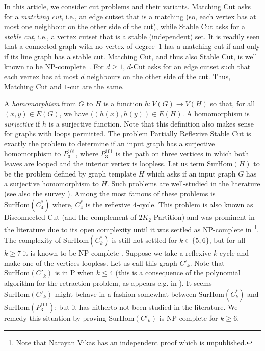 \documentclass[a4paper,UKenglish,cleveref, autoref,thm-restate]{lipics-v2021}
\newcommand{\SurHom}{\ensuremath{\mathrm{SurHom}}}
\begin{document}
In this article, we consider cut problems and their variants. 
{\sc Matching Cut} asks 
for a {\it matching cut}, i.e., an edge cutset that is a matching (so, each vertex has at most one neighbour on the other side of the cut),  while {\sc Stable Cut} asks for a
{\it stable cut}, i.e., a vertex cutset that is a stable (independent) set. 
It is readily seen that a connected graph with no vertex of degree~$1$ has a matching cut if and only if its line graph has a stable cut. 
{\sc Matching Cut}, and thus also {\sc Stable Cut}, is well known to be
NP-complete~\cite{Chvatal1984}.
For $d\geq 1$, {\sc $d$-Cut} asks for an edge cutset
such that
each vertex has at most $d$ neighbours on the other side of the cut.  Thus, {\sc Matching Cut} and {\sc $1$-cut} are the same.

A \emph{homomorphism} from $G$ to $H$ is a function $h:V(G)\rightarrow V(H)$ so that, for all $(x,y) \in E(G)$, we have $((h(x),h(y)) \in E(H)$. A homomorphism is \emph{surjective} if $h$ is a surjective function. Note that this definition also makes sense for graphs with loops permitted. The problem  {\sc Partially Reflexive Stable Cut} is exactly the problem to determine if an input graph has a surjective homomorphism to $P_3^{101}$, where $P_3^{101}$ is the path on three vertices in which both leaves are looped and the interior vertex is loopless. Let us term $\SurHom(H)$ to be the problem defined by graph template $H$ which asks if an input graph $G$ has a surjective homomorphism to $H$. Such problems are well-studied in the literature \cite{GolovachPaulusmaSong,MartinP15} (see also the survey \cite{BodirskyKM12}). Among the most famous of these problems is $\SurHom(C^*_4)$ where, $C^*_4$ is the reflexive $4$-cycle. This problem is also known as {\sc Disconnected Cut} (and the complement of {\sc $2K_2$-Partition}) and was prominent in the literature due to its open complexity until it was settled as NP-complete in \cite{MartinP15}\footnote{Note that Narayan Vikas has an independent proof which is unpublished.}. The complexity of $\SurHom(C^*_k)$ is still not settled for $k \in \{5,6\}$, but for all $k \geq 7$ it is known to be NP-complete \cite{Russian}. Suppose we take a reflexive $k$-cycle and make one of the vertices loopless. Let us call this graph $C'_k$. Note that $\SurHom(C'_k)$ is in P when $k\leq 4$ (this is a consequence of the polynomial algorithm for the retraction problem, as appears \mbox{e.g.} in \cite{Pseudoforests}). It seems $\SurHom(C'_k)$ might behave in a fashion somewhat between $\SurHom(C^*_k)$ and $\SurHom(P_3^{101})$; but it has hitherto not been studied in the literature. We remedy this situation by proving $\SurHom(C'_k)$ is NP-complete for $k \geq 6$.
\end{document}
